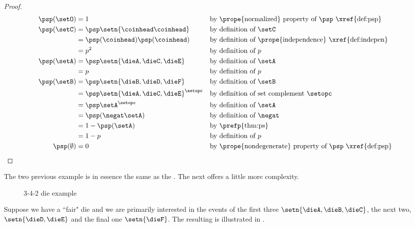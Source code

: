 \begin{proof}
\begin{align*}
  \psp(\setO)
    &= 1
    && \text{by \prope{normalized} property of $\psp$ \xref{def:psp}}
  \\
  \psp(\setC)
    &= \psp\setn{\coinhead\coinhead}
    && \text{by definition of $\setC$}
  \\&= \psp(\coinhead)\psp(\coinhead)
    && \text{by definition of \prope{independence} \xref{def:indepen}}
  \\&= p^2
    && \text{by definition of $p$}
  \\
  \psp(\setA)
    &= \psp\setn{\dieA,\dieC,\dieE}
    && \text{by definition of $\setA$}
  \\&= p
    && \text{by definition of $p$}
  \\
  \psp(\setB)
    &= \psp\setn{\dieB,\dieD,\dieF}
    && \text{by definition of $\setB$}
  \\&= \psp\setn{\dieA,\dieC,\dieE}^\setopc
    && \text{by definition of set complement $\setopc$}
  \\&= \psp\setA^\setopc
    && \text{by definition of $\setA$}
  \\&= \psp(\negat\setA)
    && \text{by definition of $\negat$}
  \\&= 1-\psp(\setA)
    && \text{by \prefp{thm:ps}}
  \\&= 1-p
    && \text{by definition of $p$}
  \\
  \psp(\emptyset)
    &= 0
    && \text{by \prope{nondegenerate} property of $\psp$ \xref{def:psp}}
\end{align*}
\end{proof}


The two previous  example  is in essence the same as the 
 .
The next offers a little more complexity.
\begin{figure}[h]%
  \centering
  \caption{3-4-2 die example  \label{fig:die_342}}
\end{figure}
\begin{example}
\label{ex:die_342}
Suppose we have a ``fair" die and we are primarily interested in the
events of the first three $\setn{\dieA,\dieB,\dieC}$, the next two, $\setn{\dieD,\dieE}$ and the final one $\setn{\dieF}$.
The resulting  is illustrated in .
\end{example}

